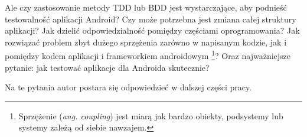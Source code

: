 Ale czy zastosowanie metody TDD lub BDD jest wystarczające, aby podnieść testowalność aplikacji Android? Czy może potrzebna jest zmiana całej struktury aplikacji? Jak dzielić odpowiedzialność pomiędzy częściami oprogramowania? Jak rozwiązać problem zbyt dużego sprzężenia zarówno w napisanym kodzie, jak i pomiędzy kodem aplikacji i frameworkiem androidowym \footnote{Sprzężenie (\textit{ang. coupling}) jest miarą jak bardzo obiekty, podsystemy lub systemy zależą od siebie nawzajem.}? Oraz najważniejsze pytanie: jak testować aplikacje dla Androida skutecznie?

Na te pytania autor postara się odpowiedzieć w dalszej części pracy.



